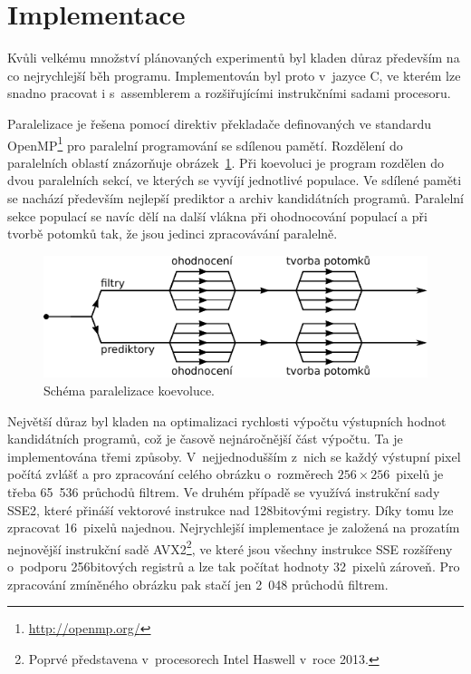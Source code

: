 \documentclass[czech]{ExcelAtFIT} %
\begin{document}
\section{Implementace}
\label{sec:Implementation}

Kvůli velkému množství plánovaných experimentů byl kladen důraz především na co nejrychlejší běh programu. Implementován byl proto v~jazyce C, ve kterém lze snadno pracovat i s~assemblerem a rozšiřujícími instrukčními sadami procesoru.

Paralelizace je řešena pomocí direktiv překladače definovaných ve standardu OpenMP\footnote{\url{http://openmp.org/}} pro paralelní programování se sdílenou pamětí. Rozdělení do paralelních oblastí znázorňuje obrázek~\ref{fig:ParallelSections}. Při koevoluci je program rozdělen do dvou paralelních sekcí, ve kterých se vyvíjí jednotlivé populace. Ve sdílené paměti se nachází především nejlepší prediktor a archiv kandidátních programů. Paralelní sekce populací se navíc dělí na další vlákna při ohodnocování populací a při tvorbě potomků tak, že jsou jedinci zpracovávání paralelně.

\begin{figure}[htb]
    \centering
    \includegraphics[width=0.9\linewidth]{images/openmp.pdf}
    \caption{Schéma paralelizace koevoluce.}
    \label{fig:ParallelSections}
\end{figure}

Největší důraz byl kladen na optimalizaci rychlosti výpočtu výstupních hodnot kandidátních programů, což je časově nejnáročnější část výpočtu. Ta je imple\-men\-to\-vána třemi způsoby. V~nejjednodušším z~nich se každý výstupní pixel počítá zvlášť a pro zpra\-co\-vání celého obrázku o~rozměrech $256\times256$~pixelů je třeba 65~536 průchodů filtrem. Ve druhém případě se využívá instrukční sady SSE2, které přináší vek\-to\-rové instrukce nad 128bitovými registry. Díky tomu lze zpracovat 16~pixelů najednou. Nejrychlejší im\-ple\-men\-tace je založená na prozatím nejnovější instrukční sadě AVX2\footnote{Poprvé představena v~procesorech Intel Haswell v~roce 2013.}, ve které jsou všechny instrukce SSE rozšířeny o~podporu 256bitových registrů a lze tak počítat hodnoty 32~pixelů zároveň. Pro zpracování zmíněného obrázku pak stačí jen 2~048 průchodů filtrem.
\end{document}
